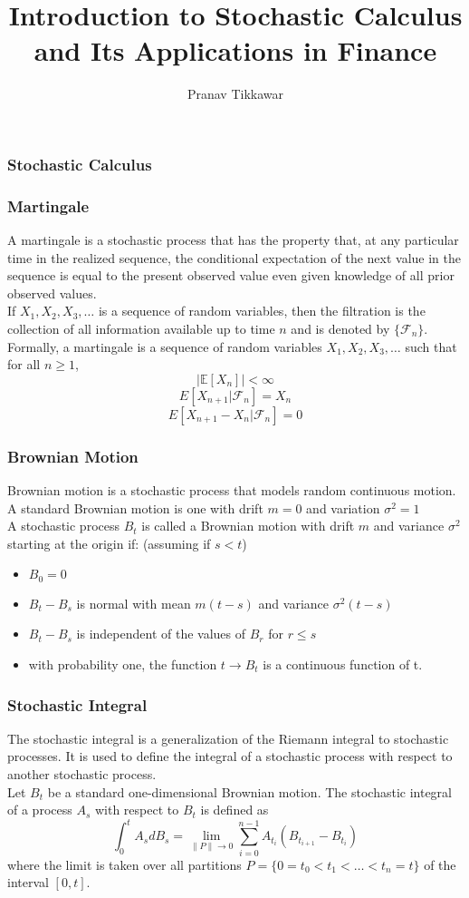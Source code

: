 \documentclass{beamer}
\author{Pranav Tikkawar}
\title{Introduction to Stochastic Calculus and Its Applications in Finance}
\begin{document}
\begin{frame}
    \frametitle{Stochastic Calculus}
    \titlepage
\end{frame}

\begin{frame}
    \frametitle{Martingale}
    A martingale is a stochastic process that has the property that, at any particular time in the realized sequence, the conditional expectation of the next value in the sequence is equal to the present observed value even given knowledge of all prior observed values.\\
    \vspace{0.5cm}
    If $X_1, X_2, X_3, \ldots$  is a sequence of random variables, then the filtration is the collection of all information available up to time $n$ and is denoted by $\{\mathcal{F}_n\}$.\\ 
    \vspace{0.5cm}
    Formally, a martingale is a sequence of random variables $X_1, X_2, X_3, \ldots$ such that for all $n \geq 1$,
    $$|\mathbb{E}[X_n]| < \infty$$
    $$E[X_{n+1} | \mathcal{F}_n] = X_n$$
    $$E[X_{n+1} - X_n | \mathcal{F}_n] = 0$$
\end{frame}

\begin{frame}
    \frametitle{Brownian Motion}
    Brownian motion is a stochastic process that models random continuous motion.\\
    A standard Brownian motion is one with drift $m=0$ and variation $\sigma^2= 1$\\
    A stochastic process $B_t$ is called a Brownian motion with drift $m$ and variance $\sigma^2$ starting at the origin if: (assuming if $s<t$)
    \begin{itemize}
        \item $B_0 = 0$
        \item $B_t -B_s$ is normal with mean $m(t-s)$ and variance $\sigma^2(t-s)$
        \item $B_t - B_s$ is independent of the values of $B_r$ for $r \leq s$
        \item with probability one, the function $t \rightarrow B_t$ is a continuous function of t.
    \end{itemize}

\end{frame}

\begin{frame}
    \frametitle{Stochastic Integral}
    The stochastic integral is a generalization of the Riemann integral to stochastic processes. It is used to define the integral of a stochastic process with respect to another stochastic process.\\
    \vspace{0.5cm}
    Let $B_t$ be a standard one-dimensional Brownian motion. The stochastic integral of a process $A_s$ with respect to $B_t$ is defined as
    $$\int_{0}^{t} A_s dB_s = \lim_{\|P\| \to 0} \sum_{i=0}^{n-1} A_{t_{i}} (B_{t_{i+1}} - B_{t_{i}})$$
    where the limit is taken over all partitions $P = \{0 = t_0 < t_1 < \ldots < t_n = t\}$ of the interval $[0,t]$.
\end{frame}
\end{document}
